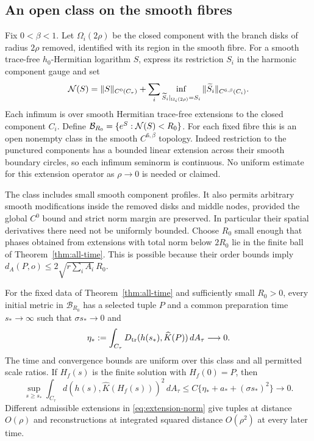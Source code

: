 \subsection{An open class on the smooth fibres}
Fix $0<\beta<1$. Let $\Omega_i(2\rho)$ be the closed component
with the branch disks of radius $2\rho$ removed, identified with
its region in the smooth fibre. For a smooth trace-free
$h_0$-Hermitian logarithm $S$, express its restriction $S_i$
in the harmonic component gauge and set
\begin{equation}\label{eq:extension-norm}
 \mathcal N(S)=\|S\|_{C^0(C_\tau)}
  +\sum_i\inf_{\widetilde S_i|_{\Omega_i(2\rho)}=S_i}
                    \|\widetilde S_i\|_{C^{6,\beta}(C_i)}.
\end{equation}
Each infimum is over smooth Hermitian trace-free extensions
to the closed component $C_i$.
Define $\mathcal B_{R_0}=\{e^S:\mathcal N(S)<R_0\}$. For each
fixed fibre this is an open nonempty class in the smooth
$C^{6,\beta}$ topology. Indeed restriction to the punctured
components has a bounded linear extension across their smooth
boundary circles, so each infimum seminorm is continuous.
No uniform estimate for this extension operator as
$\rho\to0$ is needed or claimed.

The class includes small smooth component profiles. It also
permits arbitrary smooth modifications inside the removed disks
and middle nodes, provided the global $C^0$ bound and strict
norm margin are preserved. In particular their spatial
derivatives there need not be uniformly bounded. Choose $R_0$
small enough that phases obtained from extensions with total
norm below $2R_0$ lie in the finite ball of
Theorem~\ref{thm:all-time}. This is possible because their
order bounds imply
$d_A(P,o)\le2\sqrt{r\sum_i A_i}\,R_0$.

\begin{theorem}\label{thm:spatial-entry}
For the fixed data of Theorem~\ref{thm:all-time} and sufficiently
small $R_0>0$, every initial metric in $\mathcal B_{R_0}$ has
a selected tuple $P$ and a common preparation time
$s_*\to\infty$ such that $\sigma s_*\to0$ and
\begin{equation}\label{eq:entry-trace}
 \eta_*:=\int_{C_\tau}
             D_{\operatorname{tr}}(h(s_*),\widehat K(P))\,dA_\tau\longrightarrow0.
\end{equation}
The time and convergence bounds are uniform over this class and
all permitted scale ratios. If $H_f(s)$ is the finite solution
with $H_f(0)=P$, then
\begin{equation}\label{eq:spatial-all-time}
 \sup_{s\ge s_*}\int_{C_\tau}
      d(h(s),\widehat K(H_f(s)))^2\,dA_\tau
 \le C\{\eta_*+a_*+(\sigma s_*)^2\}\longrightarrow0.
\end{equation}
Different admissible extensions in \eqref{eq:extension-norm}
give tuples at distance $O(\rho)$ and reconstructions at
integrated squared distance $O(\rho^2)$ at every later time.
\end{theorem}

